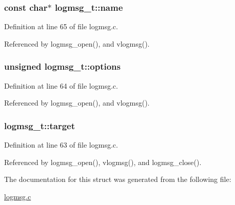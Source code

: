\hypertarget{structlogmsg__t_a65a535ef1b66e02ac0fd9bf222255d7d}{
\subsubsection[{name}]{\setlength{\rightskip}{0pt plus 5cm}const char$\ast$ {\bf logmsg\-\_\-t\-::name}}}
\label{structlogmsg__t_a65a535ef1b66e02ac0fd9bf222255d7d}


\-Definition at line 65 of file logmsg.\-c.



\-Referenced by logmsg\-\_\-open(), and vlogmsg().

\hypertarget{structlogmsg__t_acb37605a8ed44417a2c4d1c9a87f6e18}{
\subsubsection[{options}]{\setlength{\rightskip}{0pt plus 5cm}unsigned {\bf logmsg\-\_\-t\-::options}}}
\label{structlogmsg__t_acb37605a8ed44417a2c4d1c9a87f6e18}


\-Definition at line 64 of file logmsg.\-c.



\-Referenced by logmsg\-\_\-open(), and vlogmsg().

\hypertarget{structlogmsg__t_a5418565614b492b504535521be6344a3}{
\subsubsection[{target}]{ {\bf logmsg\-\_\-t\-::target}}}
\label{structlogmsg__t_a5418565614b492b504535521be6344a3}


\-Definition at line 63 of file logmsg.\-c.



\-Referenced by logmsg\-\_\-open(), vlogmsg(), and logmsg\-\_\-close().



\-The documentation for this struct was generated from the following file\-:\begin{DoxyCompactItemize}
\item 
\hyperlink{logmsg_8c}{logmsg.\-c}\end{DoxyCompactItemize}
